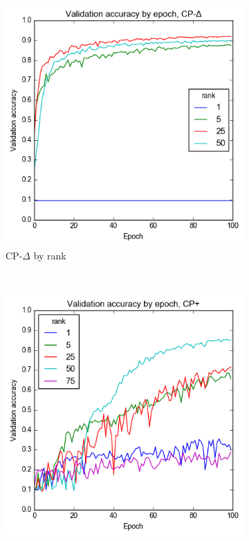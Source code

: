 \begin{figure}
\begin{subfigure}[t]{0.45\textwidth}
	\includegraphics[width=\textwidth]{exps/mnist/cp-del-rank}
	\caption{CP-\(\Delta\) by rank}
\end{subfigure}~
\begin{subfigure}[t]{0.45\textwidth}
	\includegraphics[width=\textwidth]{exps/mnist/cp+rank}

\end{subfigure}
\end{figure}
